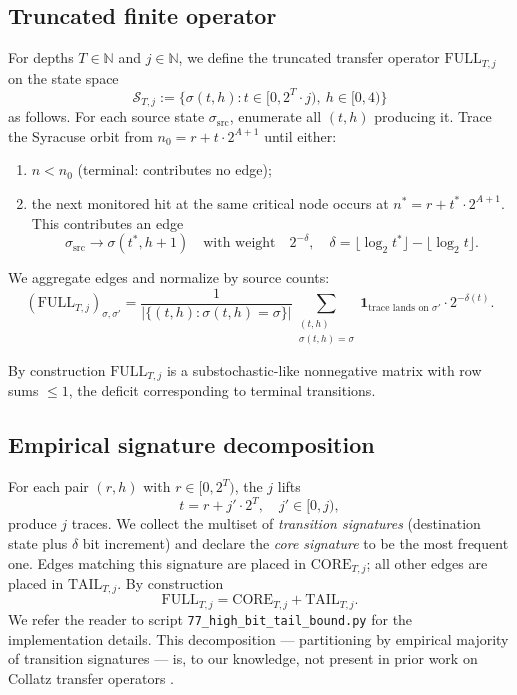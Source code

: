 \documentclass[11pt,a4paper]{article}
\theoremstyle{definition}
\newcommand{\N}{\mathbb{N}}
\newcommand{\full}{\mathrm{FULL}}
\newcommand{\core}{\mathrm{CORE}}
\newcommand{\tail}{\mathrm{TAIL}}
\begin{document}
\subsection{Truncated finite operator}

For depths $T \in \N$ and $j \in \N$, we define the truncated
transfer operator $\full_{T,j}$ on the state space
\[
\mathcal{S}_{T,j} := \{\sigma(t, h) : t \in [0, 2^T \cdot j),\ h \in [0,4)\}
\]
as follows. For each source state $\sigma_{\mathrm{src}}$, enumerate
all $(t, h)$ producing it. Trace the Syracuse orbit from
$n_0 = r + t \cdot 2^{A+1}$ until either:
\begin{enumerate}
  \item $n < n_0$ (terminal: contributes no edge);
  \item the next monitored hit at the same critical node occurs at
        $n^* = r + t^* \cdot 2^{A+1}$. This contributes an edge
        \[
        \sigma_{\mathrm{src}} \to \sigma(t^*, h+1)
        \quad\text{with weight}\quad
        2^{-\delta},
        \quad
        \delta = \lfloor \log_2 t^* \rfloor - \lfloor \log_2 t \rfloor.
        \]
\end{enumerate}
We aggregate edges and normalize by source counts:
\[
(\full_{T,j})_{\sigma, \sigma'}
= \frac{1}{|\{(t,h) : \sigma(t,h)=\sigma\}|}
  \sum_{\substack{(t,h) \\ \sigma(t,h)=\sigma}}
  \mathbf{1}_{\text{trace lands on }\sigma'}
  \cdot 2^{-\delta(t)}.
\]

By construction $\full_{T,j}$ is a substochastic-like nonnegative
matrix with row sums $\le 1$, the deficit corresponding to terminal
transitions.

\subsection{Empirical signature decomposition}

For each pair $(r, h)$ with $r \in [0, 2^T)$, the $j$ lifts
\[
t = r + j' \cdot 2^T, \quad j' \in [0, j),
\]
produce $j$ traces. We collect the multiset of \emph{transition
signatures} (destination state plus $\delta$ bit increment) and
declare the \emph{core signature} to be the most frequent one. Edges
matching this signature are placed in $\core_{T,j}$; all other
edges are placed in $\tail_{T,j}$. By construction
\[
\full_{T,j} = \core_{T,j} + \tail_{T,j}.
\]
We refer the reader to script
\verb|77_high_bit_tail_bound.py| for the implementation details.
This decomposition --- partitioning by empirical majority of
transition signatures --- is, to our knowledge, not present in
prior work on Collatz transfer operators
\cite{chang2026,neklyudov2022,leventides2020,mori2025}.
\end{document}

